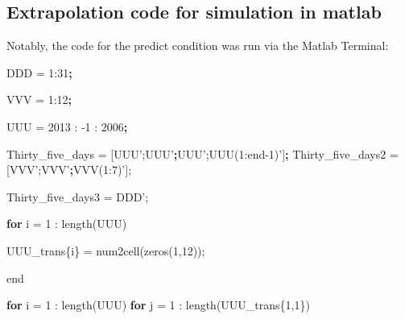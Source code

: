 \documentclass[]{DissertateUSU}
\newenvironment{Shaded}{\begin{snugshade}}{\end{snugshade}}
\newcommand{\KeywordTok}[1]{\textcolor[rgb]{0.13,0.29,0.53}{\textbf{#1}}}
\newcommand{\DataTypeTok}[1]{\textcolor[rgb]{0.13,0.29,0.53}{#1}}
\newcommand{\StringTok}[1]{\textcolor[rgb]{0.31,0.60,0.02}{#1}}
\newcommand{\ExtensionTok}[1]{#1}
\newcommand{\NormalTok}[1]{#1}
\begin{document}
\normalsize

\clearpage

\subsection*{Extrapolation code for simulation in
matlab}\label{extrapolation-code-for-simulation-in-matlab}

Notably, the code for the predict condition was run via the Matlab
Terminal:

\small

\begin{Shaded}
\begin{Highlighting}[]

\ExtensionTok{%
\ExtensionTok{%

\ExtensionTok{DDD}\NormalTok{ = 1:31}\KeywordTok{;}

\ExtensionTok{%

\ExtensionTok{VVV}\NormalTok{ = 1:12}\KeywordTok{;}

\ExtensionTok{%

\ExtensionTok{UUU}\NormalTok{ = 2013 : -1 : 2006}\KeywordTok{;}

\ExtensionTok{%
\ExtensionTok{%
\ExtensionTok{Thirty_five_days}\NormalTok{ = [UUU}\StringTok{';UUU'}\KeywordTok{;}\ExtensionTok{UUU}\StringTok{';UUU(1:end-1)'}\NormalTok{]}\KeywordTok{;}
\ExtensionTok{%
\ExtensionTok{Thirty_five_days2}\NormalTok{ = [VVV}\StringTok{';VVV'}\KeywordTok{;}\ExtensionTok{VVV}\NormalTok{(1:7)}\StringTok{'];}
\StringTok{%
\StringTok{Thirty_five_days3 = DDD'}\NormalTok{;}

\ExtensionTok{%

\ExtensionTok{%
\KeywordTok{for} \ExtensionTok{i}\NormalTok{ = 1 : length(UUU)}
    
    \ExtensionTok{UUU_trans}\DataTypeTok{\{i\}}\NormalTok{ = num2cell(zeros(1,12));}
    
\ExtensionTok{end}

\KeywordTok{for} \ExtensionTok{i}\NormalTok{ = 1 : length(UUU)}
    \KeywordTok{for} \ExtensionTok{j}\NormalTok{ = 1 : length(UUU_trans}\DataTypeTok{\{1,1\}}\NormalTok{)}
        
}}}}}}}}}}
\end{Highlighting}
\end{Shaded}
\end{document}
